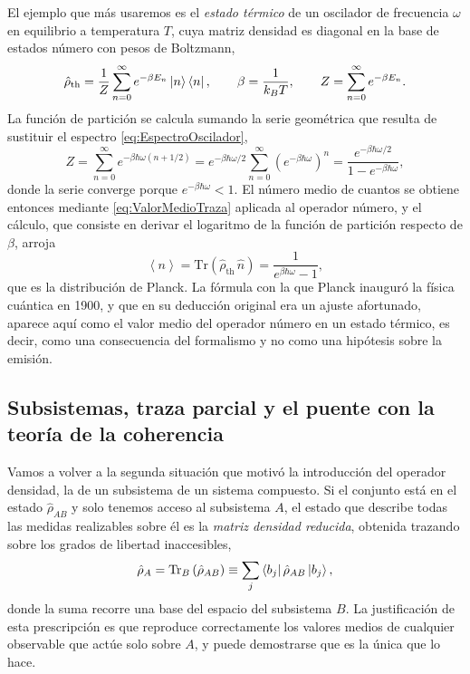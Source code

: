        El ejemplo que más usaremos es el \textit{estado térmico} de un oscilador de frecuencia $\omega$ en equilibrio a temperatura $T$, cuya matriz densidad es diagonal en la base de estados número con pesos de Boltzmann,
        \begin{equation}\label{eq:EstadoTermico}
            \hat{\rho}_{\mathrm{th}} = \frac{1}{Z}\sum_{n=0}^{\infty}e^{-\beta E_{n}}\ket{n}\bra{n},
            \qquad
            \beta = \frac{1}{k_{B}T},
            \qquad
            Z = \sum_{n=0}^{\infty}e^{-\beta E_{n}} .
        \end{equation}
        La función de partición se calcula sumando la serie geométrica que resulta de sustituir el espectro \eqref{eq:EspectroOscilador},
        \begin{equation}\label{eq:FuncionParticion}
            Z = \sum_{n=0}^{\infty}e^{-\beta\hbar\omega\left(n+1/2\right)} = e^{-\beta\hbar\omega/2}\sum_{n=0}^{\infty}\left(e^{-\beta\hbar\omega}\right)^{n}
            = \frac{e^{-\beta\hbar\omega/2}}{1 - e^{-\beta\hbar\omega}},
        \end{equation}
        donde la serie converge porque $e^{-\beta\hbar\omega}<1$. El número medio de cuantos se obtiene entonces mediante \eqref{eq:ValorMedioTraza} aplicada al operador número, y el cálculo, que consiste en derivar el logaritmo de la función de partición respecto de $\beta$, arroja
        \begin{equation}\label{eq:Planck}
            \left\langle n\right\rangle = \mathrm{Tr}\left(\hat{\rho}_{\mathrm{th}}\,\hat{n}\right) = \frac{1}{e^{\beta\hbar\omega}-1},
        \end{equation}
        que es la distribución de Planck. La fórmula con la que Planck inauguró la física cuántica en 1900, y que en su deducción original era un ajuste afortunado, aparece aquí como el valor medio del operador número en un estado térmico, es decir, como una consecuencia del formalismo y no como una hipótesis sobre la emisión.

    \subsection{Subsistemas, traza parcial y el puente con la teoría de la coherencia}

        Vamos a volver a la segunda situación que motivó la introducción del operador densidad, la de un subsistema de un sistema compuesto. Si el conjunto está en el estado $\hat{\rho}_{AB}$ y solo tenemos acceso al subsistema $A$, el estado que describe todas las medidas realizables sobre él es la \textit{matriz densidad reducida}, obtenida trazando sobre los grados de libertad inaccesibles,
        \begin{equation}\label{eq:TrazaParcial}
            \hat{\rho}_{A} = \mathrm{Tr}_{B}\left(\hat{\rho}_{AB}\right) \equiv \sum_{j}\bra{b_{j}}\hat{\rho}_{AB}\ket{b_{j}},
        \end{equation}
        donde la suma recorre una base del espacio del subsistema $B$. La justificación de esta prescripción es que reproduce correctamente los valores medios de cualquier observable que actúe solo sobre $A$, y puede demostrarse que es la única que lo hace.

